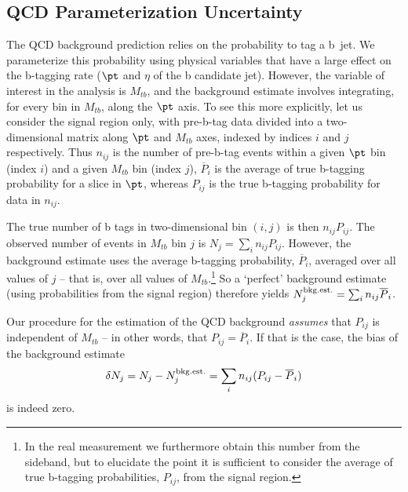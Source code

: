 
\clearpage

\subsection{QCD Parameterization Uncertainty}
\label{sec:qcdpunc}

The QCD background prediction relies on the probability to tag a b~jet.  
We parameterize this probability using physical variables that
have a large effect on the b-tagging rate ($\pt$ and $\eta$ of the b
candidate jet).  However, the variable of interest in the analysis
is $M_{tb}$, and the background estimate involves integrating, for
every bin in $M_{tb}$, along the $\pt$ axis.  To see this more
explicitly, let us consider the signal region only, with pre-b-tag
data divided into a two-dimensional matrix along $\pt$ and
$M_{tb}$ axes, indexed by indices $i$ and $j$ respectively.
Thus $n_{ij}$ is the number of pre-b-tag events within a given $\pt$
bin (index $i$) and a given $M_{tb}$ bin (index $j$), 
$\overline P_i$ is the average of true b-tagging probability for a slice 
in $\pt$, whereas $P_{ij}$ is the true b-tagging probability for
data in $n_{ij}$.

The true number of b tags in two-dimensional bin $(i,j)$ is then
$n_{ij} P_{ij}$.  The observed number of events in $M_{tb}$ bin $j$ is
$N_j = \sum_i n_{ij} P_{ij}$.  However, the background
estimate uses the average b-tagging probability, $\overline P_i$,
averaged over all values of $j$ -- that is, over all values of 
$M_{tb}$.\footnote{In the real measurement we
furthermore obtain this number from the sideband, but to elucidate the
point it is sufficient to consider the average of true b-tagging
probabilities, $P_{ij}$, from the signal region.} 
So a `perfect' background estimate (using probabilities from the
signal region) therefore
yields $N_j^{\rm bkg.est.} = \sum_i n_{ij} \overline P_i$.

Our procedure for the estimation of the QCD background {\it assumes}
that $P_{ij}$ is independent of $M_{tb}$ -- in other words, that
$P_{ij} = \overline P_i$.  If that is the case, the bias of the
background estimate
\begin{equation}
  \delta N_j = N_j - N_j^{\rm bkg.est.} = \sum_i n_{ij} (P_{ij} - \overline P_i)
  \label{eq:qcd_bias}
\end{equation}
is indeed zero.

